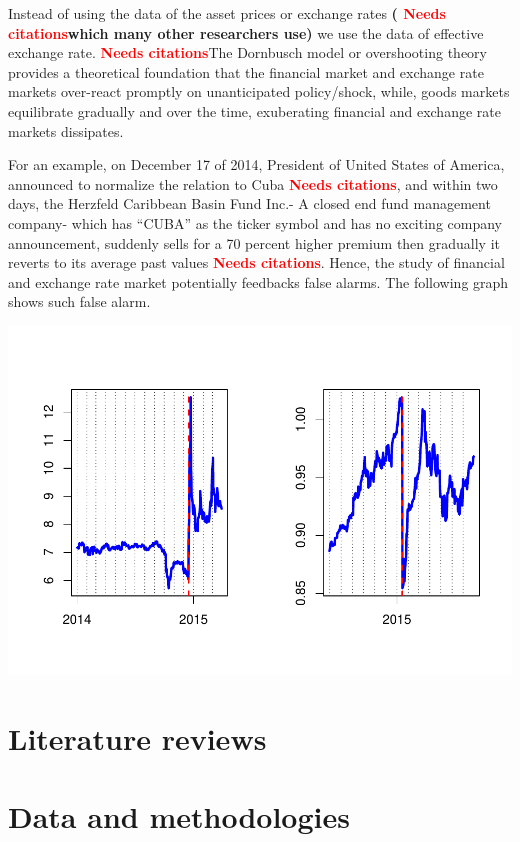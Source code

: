 \documentclass[]{elsarticle} %
\makeatletter
\def\maxwidth{\ifdim\Gin@nat@width>\linewidth\linewidth
\else\Gin@nat@width\fi}
\let\Oldincludegraphics\includegraphics
\renewcommand{\includegraphics}[1]{\Oldincludegraphics[width=\maxwidth]{#1}}
\makeatother
\begin{document}
Instead of using the data of the asset prices or exchange rates
\textbf{( \textcolor{red}{Needs citations}which many other researchers
use)} we use the data of effective exchange rate.
\textbf{\textcolor{red}{Needs citations}}The Dornbusch model or
overshooting theory provides a theoretical foundation that the financial
market and exchange rate markets over-react promptly on unanticipated
policy/shock, while, goods markets equilibrate gradually and over the
time, exuberating financial and exchange rate markets dissipates.

For an example, on December 17 of 2014, President of United States of
America, announced to normalize the relation to Cuba
\textbf{\textcolor{red}{Needs citations}}, and within two days, the
Herzfeld Caribbean Basin Fund Inc.- A closed end fund management
company- which has ``CUBA'' as the ticker symbol and has no exciting
company announcement, suddenly sells for a 70 percent higher premium
then gradually it reverts to its average past values
\textbf{\textcolor{red}{Needs citations}}. Hence, the study of financial
and exchange rate market potentially feedbacks false alarms. The
following graph shows such false alarm.

\includegraphics{Main_files/figure-latex/unnamed-chunk-2-1.pdf}

\section{Literature reviews}\label{literature-reviews}

\section{Data and methodologies}\label{data-and-methodologies}
\end{document}
